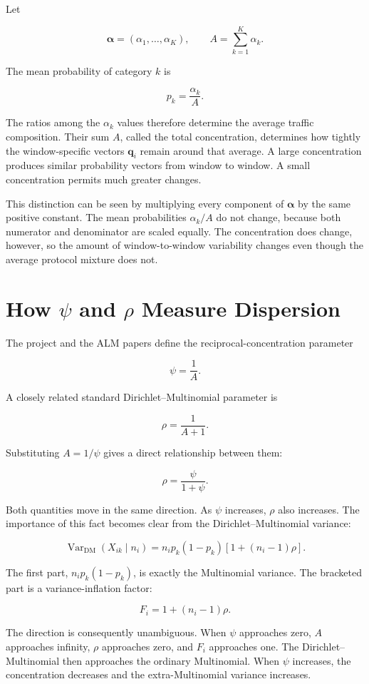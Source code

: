 \documentclass[11pt,a4paper]{article}
\begin{document}
Let

\[
\boldsymbol{\alpha}=(\alpha_1,\ldots,\alpha_K),
\qquad
A=\sum_{k=1}^{K}\alpha_k.
\]

The mean probability of category $k$ is

\[
p_k=\frac{\alpha_k}{A}.
\]

The ratios among the $\alpha_k$ values therefore determine the average traffic
composition.  Their sum $A$, called the total concentration, determines how
tightly the window-specific vectors $\mathbf{q}_i$ remain around that average.
A large concentration produces similar probability vectors from window to
window.  A small concentration permits much greater changes.

This distinction can be seen by multiplying every component of
$\boldsymbol{\alpha}$ by the same positive constant.  The mean probabilities
$\alpha_k/A$ do not change, because both numerator and denominator are scaled
equally.  The concentration does change, however, so the amount of
window-to-window variability changes even though the average protocol mixture
does not.

\section{How $\psi$ and $\rho$ Measure Dispersion}

The project and the ALM papers define the reciprocal-concentration parameter

\[
\psi=\frac{1}{A}.
\]

A closely related standard Dirichlet--Multinomial parameter is

\[
\rho=\frac{1}{A+1}.
\]

Substituting $A=1/\psi$ gives a direct relationship between them:

\[
\rho=\frac{\psi}{1+\psi}.
\]

Both quantities move in the same direction.  As $\psi$ increases, $\rho$
also increases.  The importance of this fact becomes clear from the
Dirichlet--Multinomial variance:

\[
\operatorname{Var}_{\mathrm{DM}}(X_{ik}\mid n_i)
=
n_i p_k(1-p_k)
\left[1+(n_i-1)\rho\right].
\]

The first part, $n_i p_k(1-p_k)$, is exactly the Multinomial variance.  The
bracketed part is a variance-inflation factor:

\[
F_i=1+(n_i-1)\rho.
\]

The direction is consequently unambiguous.  When $\psi$ approaches zero,
$A$ approaches infinity, $\rho$ approaches zero, and $F_i$ approaches one.
The Dirichlet--Multinomial then approaches the ordinary Multinomial.  When
$\psi$ increases, the concentration decreases and the extra-Multinomial
variance increases.
\end{document}
